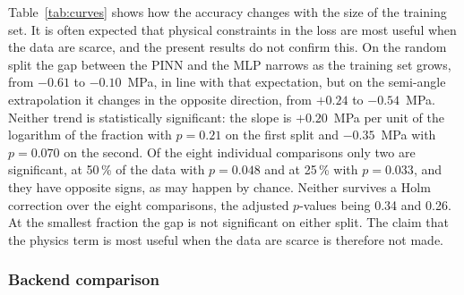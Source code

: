 Table~\ref{tab:curves} shows how the accuracy changes with the size of the training set. It is often expected that physical constraints in the loss are most useful when the data are scarce, and the present results do not confirm this. On the random split the gap between the PINN and the MLP narrows as the training set grows, from $-0.61$ to $-0.10$~MPa, in line with that expectation, but on the semi-angle extrapolation it changes in the opposite direction, from $+0.24$ to $-0.54$~MPa. Neither trend is statistically significant: the slope is $+0.20$~MPa per unit of the logarithm of the fraction with $p=0.21$ on the first split and $-0.35$~MPa with $p=0.070$ on the second. Of the eight individual comparisons only two are significant, at 50\,\% of the data with $p=0.048$ and at 25\,\% with $p=0.033$, and they have opposite signs, as may happen by chance. Neither survives a Holm correction over the eight comparisons, the adjusted $p$-values being 0.34 and 0.26. At the smallest fraction the gap is not significant on either split. The claim that the physics term is most useful when the data are scarce is therefore not made.

\subsubsection{Backend comparison}
\label{sec:res_backend}

